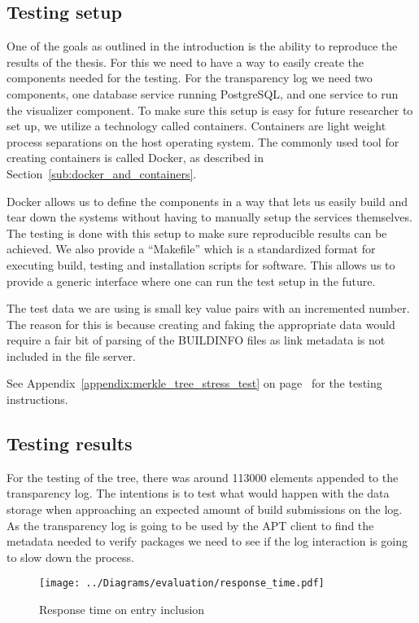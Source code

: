 \documentclass[../Main/thesis.tex]{subfiles}
\begin{document}
\subsection*{Testing setup}%
\label{sub:testing_setup}
One of the goals as outlined in the introduction is the ability to reproduce the
results of the thesis. For this we need to have a way to easily create the
components needed for the testing. For the transparency log we need two
components, one database service running PostgreSQL, and one service to run the
visualizer component. To make sure this setup is easy for future researcher to
set up, we utilize a technology called containers. Containers are light weight
process separations on the host operating system. The commonly used tool for
creating containers is called Docker, as described
in Section~\ref{sub:docker_and_containers}.

Docker allows us to define the components in a way that lets us easily build and
tear down the systems without having to manually setup the services themselves.
The testing is done with this setup to make sure reproducible results can be
achieved. We also provide a ``Makefile'' which is a standardized format for
executing build, testing and installation scripts for software. This allows us
to provide a generic interface where one can run the test setup in the future.

The test data we are using is small key value pairs with an incremented number.
The reason for this is because creating and faking the appropriate data would
require a fair bit of parsing of the BUILDINFO files as link metadata is not
included in the file server.

See Appendix~\ref{appendix:merkle_tree_stress_test} on
page~\pageref{appendix:merkle_tree_stress_test} for the testing instructions.

\subsection*{Testing results}%
\label{sub:testing_results}
For the testing of the tree, there was around 113000 elements appended to the
transparency log. The intentions is to test what would happen with the data
storage when approaching an expected amount of build submissions on the log.
As the transparency log is going to be used by the APT client to find the
metadata needed to verify packages we need to see if the log interaction is
going to slow down the process.

\begin{figure}[H]
\centering
\texttt{[image: ../Diagrams/evaluation/response\_time.pdf]}
\caption{Response time on entry inclusion}
\label{fig:response_time}
\end{figure}
\end{document}
